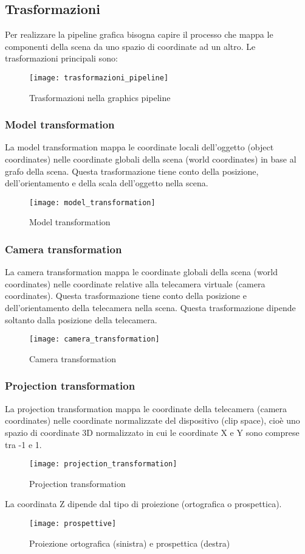 \documentclass[a4paper]{article}
\begin{document}
\subsection{Trasformazioni}
Per realizzare la pipeline grafica bisogna capire il processo che mappa le componenti
della scena da uno spazio di coordinate ad un altro. Le trasformazioni principali sono:
\begin{figure}[H]
  \centering
  \texttt{[image: trasformazioni\_pipeline]}
  \caption{Trasformazioni nella graphics pipeline}
\end{figure}

\subsubsection{Model transformation}
La model transformation mappa le coordinate locali dell'oggetto (object coordinates)
nelle coordinate globali della scena (world coordinates) in base al grafo della scena.
Questa trasformazione tiene conto della posizione, dell'orientamento e della scala
dell'oggetto nella scena.
\begin{figure}[H]
  \centering
  \texttt{[image: model\_transformation]}
  \caption{Model transformation}
\end{figure}

\subsubsection{Camera transformation}
La camera transformation mappa le coordinate globali della scena (world coordinates)
nelle coordinate relative alla telecamera virtuale (camera coordinates). Questa
trasformazione tiene conto della posizione e dell'orientamento della telecamera
nella scena. Questa trasformazione dipende soltanto dalla posizione della telecamera.
\begin{figure}[H]
  \centering
  \texttt{[image: camera\_transformation]}
  \caption{Camera transformation}
\end{figure}

\subsubsection{Projection transformation}
La projection transformation mappa le coordinate della telecamera (camera coordinates)
nelle coordinate normalizzate del dispositivo (clip space),
cioè uno spazio di coordinate 3D normalizzato in cui le coordinate X e Y sono comprese
tra -1 e 1.
\begin{figure}[H]
  \centering
  \texttt{[image: projection\_transformation]}
  \caption{Projection transformation}
\end{figure}
La coordinata Z dipende dal tipo di proiezione (ortografica o prospettica).
\begin{figure}[H]
  \centering
  \texttt{[image: prospettive]}
  \caption{Proiezione ortografica (sinistra) e prospettica (destra)}
\end{figure}
\end{document}
